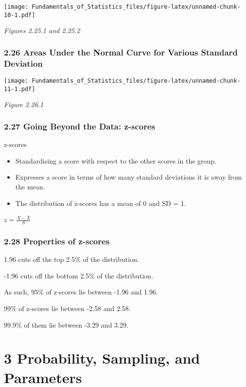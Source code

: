 \documentclass[]{article}
\providecommand{\tightlist}{%
  \setlength{\itemsep}{0pt}\setlength{\parskip}{0pt}}
\begin{document}
\texttt{[image: Fundamentals\_of\_Statistics\_files/figure-latex/unnamed-chunk-10-1.pdf]}

\emph{Figures 2.25.1 and 2.25.2}

\hypertarget{areas-under-the-normal-curve-for-various-standard-deviation}{%
\subsubsection{2.26 Areas Under the Normal Curve for Various Standard
Deviation}\label{areas-under-the-normal-curve-for-various-standard-deviation}}

\texttt{[image: Fundamentals\_of\_Statistics\_files/figure-latex/unnamed-chunk-11-1.pdf]}

\emph{Figure 2.26.1}

\hypertarget{going-beyond-the-data-z-scores}{%
\subsubsection{2.27 Going Beyond the Data:
z-scores}\label{going-beyond-the-data-z-scores}}

z-scores

\begin{itemize}
\tightlist
\item
  Standardising a score with respect to the other scores in the group.
\item
  Expresses a score in terms of how many standard deviations it is away
  from the mean.
\item
  The distribution of z-scores has a mean of 0 and SD = 1.
\end{itemize}

\(z = \frac{X-\bar{X}}{S}\)

\hypertarget{properties-of-z-scores}{%
\subsubsection{2.28 Properties of
z-scores}\label{properties-of-z-scores}}

1.96 cuts off the top 2.5\% of the distribution.

-1.96 cuts off the bottom 2.5\% of the distribution.

As such, 95\% of z-scores lie between -1.96 and 1.96.

99\% of z-scores lie between -2.58 and 2.58.

99.9\% of them lie between -3.29 and 3.29.

\hypertarget{probability-sampling-and-parameters}{%
\section{3 Probability, Sampling, and
Parameters}\label{probability-sampling-and-parameters}}
\end{document}
